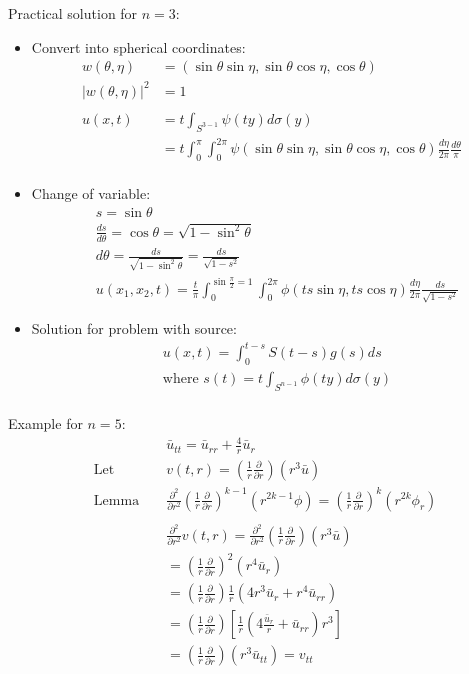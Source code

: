 \documentclass[12pt, a4paper]{article}
\begin{document}
Practical solution for $n=3$:
\begin{itemize}
    \item Convert into spherical coordinates:
    \begin{align*}
        w(\theta, \eta)&=(\sin\theta\sin\eta, \sin\theta\cos\eta, \cos\theta)\\
        |w(\theta, \eta)|^2&=1\\\\
        u(x, t) &= t\int_{S^{3-1}}\psi(ty)d\sigma(y)\\
        &= t\int_0^\pi\int_0^{2\pi}\psi(\sin\theta\sin\eta, \sin\theta\cos\eta, \cos\theta)\frac{d\eta}{2\pi} \frac{d\theta}{\pi}\\
    \end{align*}
    \item Change of variable:
    \begin{align*}
        &s = \sin\theta\\
        &\frac{ds}{d\theta} = \cos\theta = \sqrt{1-\sin^2\theta}\\
        &d\theta = \frac{ds}{\sqrt{1-\sin^2\theta}} = \frac{ds}{\sqrt{1-s^2}}\\
        &u(x_1, x_2, t) = \frac{t}{\pi} \int^{\sin\frac{\pi}{2}=1}_0\int^{2\pi}_{0}\phi(ts\sin\eta, ts\cos\eta)\frac{d\eta}{2\pi}\frac{ds}{\sqrt{1-s^2}} 
    \end{align*}
    \item Solution for problem with source:
    \begin{align*}
        &u(x, t) = \int^{t-s}_0S(t-s)g(s)ds\\
        &\text{where }s(t) = t\int_{S^{n-1}}\phi(ty)d\sigma(y)\\
    \end{align*}
\end{itemize}
Example for $n=5$:
\begin{align*}
    &&&\bar{u}_{tt} = \bar{u}_{rr} + \frac{4}{r}\bar{u}_r\\
    &\text{Let }&&v(t, r) = \left(\frac{1}{r}\frac{\partial}{\partial r}\right)(r^3\bar{u})\\
    &\text{Lemma }&&\frac{\partial^2}{\partial r^2}\left(\frac{1}{r}\frac{\partial}{\partial r}\right)^{k-1}(r^{2k-1}\phi)=\left(\frac{1}{r}\frac{\partial}{\partial r}\right)^{k}(r^{2k}\phi_r)\\\\
    &&&\frac{\partial^2}{\partial r^2}v(t, r) = \frac{\partial^2}{\partial r^2}\left(\frac{1}{r}\frac{\partial}{\partial r}\right)(r^3\bar{u})\\
    &&&=\left(\frac{1}{r}\frac{\partial}{\partial r}\right)^2(r^4\bar{u}_r)\\
    &&&=\left(\frac{1}{r}\frac{\partial}{\partial r}\right)\frac{1}{r}(4r^3\bar{u}_r+r^4\bar{u}_{rr})\\
    &&&=\left(\frac{1}{r}\frac{\partial}{\partial r}\right)\left[\frac{1}{r}(4\frac{\bar{u}_r}{r}+\bar{u}_{rr})r^3\right]\\
    &&&=\left(\frac{1}{r}\frac{\partial}{\partial r}\right)(r^3\bar{u}_{tt}) = v_{tt}
\end{align*}
\end{document}
